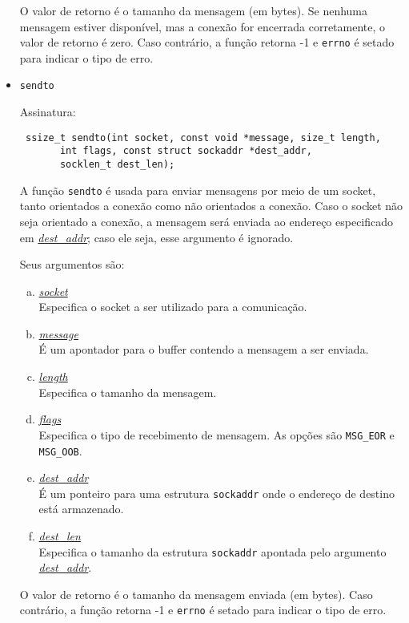\documentclass[a4paper,10pt]{article}
\begin{document}
\begin{itemize}
O valor de retorno é o tamanho da mensagem (em bytes). Se nenhuma mensagem estiver disponível, mas a conexão for encerrada corretamente, o valor de retorno é zero. Caso contrário, a função retorna -1 e {\tt errno} é setado para indicar o tipo de erro.

\item {\tt sendto}

Assinatura:
\begin{lstlisting}
 ssize_t sendto(int socket, const void *message, size_t length,
       int flags, const struct sockaddr *dest_addr,
       socklen_t dest_len);\end{lstlisting}

A função {\tt sendto} é usada para enviar mensagens por meio de um socket, tanto orientados a conexão como não orientados a conexão. Caso o socket não seja orientado a conexão, a mensagem será enviada ao endereço especificado em \textit{\underline{dest\_addr}}; caso ele seja, esse argumento é ignorado.

Seus argumentos são:
\begin{enumerate}[a)]
\item \textit{\underline{socket}}\\
Especifica o socket a ser utilizado para a comunicação.

\item \textit{\underline{message}}\\
É um apontador para o buffer contendo a mensagem a ser enviada.

\item \textit{\underline{length}}\\
Especifica o tamanho da mensagem.

\item \textit{\underline{flags}}\\
Especifica o tipo de recebimento de mensagem. As opções são {\tt MSG\_EOR} e {\tt MSG\_OOB}.

\item \textit{\underline{dest\_addr}}\\
É um ponteiro para uma estrutura {\tt sockaddr} onde o endereço de destino está armazenado.

\item \textit{\underline{dest\_len}}\\
Especifica o tamanho da estrutura {\tt sockaddr} apontada pelo argumento \textit{\underline{dest\_addr}}.
\end{enumerate}

O valor de retorno é o tamanho da mensagem enviada (em bytes). Caso contrário, a função retorna -1 e {\tt errno} é setado para indicar o tipo de erro.

\end{itemize}
\end{document}
